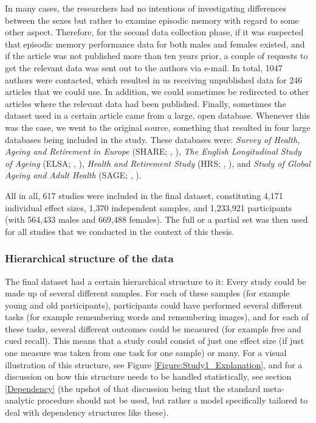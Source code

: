 In many cases, the researchers had no intentions of investigating differences between the sexes but rather to examine episodic memory with regard to some other aspect. Therefore, for the second data collection phase, if it was suspected that episodic memory performance data for both males and females existed, and if the article was not published more than ten years prior, a couple of requests to get the relevant data was sent out to the authors via e-mail. In total, 1047 authors were contacted, which resulted in us receiving unpublished data for 246 articles that we could use. In addition, we could sometimes be redirected to other articles where the relevant data had been published. Finally, sometimes the dataset used in a certain article came from a large, open database. Whenever this was the case, we went to the original source, something that resulted in four large databases being included in the study. These databases were: \emph{Survey of Health, Ageing and Retirement in Europe} (SHARE; \citeauthor{Borsch2013}, \citeyear{Borsch2013}), \emph{The English Longitudinal Study of Ageing} (ELSA; \citeauthor{Steptoe2012}, \citeyear{Steptoe2012}), \emph{Health and Retirement Study} (HRS; \citeauthor{Sonnega2014}, \citeyear{Sonnega2014}), and \emph{Study of Global Ageing and Adult Health} (SAGE; \citeauthor{Kowal2012}, \citeyear{Kowal2012}).

All in all, 617 studies were included in the final dataset, constituting 4,171 individual effect sizes, 1,370 independent samples, and 1,233,921 participants (with 564,433 males and 669,488 females). The full or a partial set was then used for all studies that we conducted in the context of this thesis.

\subsubsection{Hierarchical structure of the data} \label{Hierarchical_structure}

The final dataset had a certain hierarchical structure to it: Every study could be made up of several different samples. For each of these samples (for example young and old participants), participants could have performed several different tasks (for example remembering words and remembering images), and for each of these tasks, several different outcomes could be measured (for example free and cued recall). This means that a study could consist of just one effect size (if just one measure was taken from one task for one sample) or many. For a visual illustration of this structure, see Figure \ref{Figure:Study1_Explanation}, and for a discussion on how this structure needs to be handled statistically, see section \ref{Dependency} (the upshot of that discussion being that the standard meta-analytic procedure should not be used, but rather a model specifically tailored to deal with dependency structures like these).

